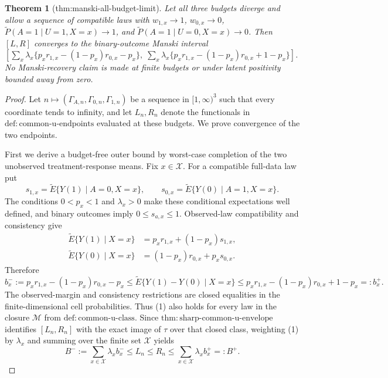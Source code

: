 \documentclass{article}
\newtheorem{theorem}{Theorem}
\begin{document}
\begin{theorem}[thm:manski-all-budget-limit]\label{thm:manski-all-budget-limit}
Let all three budgets diverge and allow a sequence of compatible laws with \(w_{1,x}\to1\), \(w_{0,x}\to0\), \(\widetilde P(A=1\mid U=1,X=x)\to1\), and \(\widetilde P(A=1\mid U=0,X=x)\to0\).  Then \([L,R]\) converges to the binary-outcome Manski interval \(\left[\sum_x\lambda_x\{p_xr_{1,x}-(1-p_x)r_{0,x}-p_x\},\;\sum_x\lambda_x\{p_xr_{1,x}-(1-p_x)r_{0,x}+1-p_x\}\right]\).  No Manski-recovery claim is made at finite budgets or under latent positivity bounded away from zero.
\end{theorem}
\begin{proof}
Let \(n\mapsto(\Gamma_{A,n},\Gamma_{0,n},\Gamma_{1,n})\) be a sequence in \([1,\infty)^3\) such that every coordinate tends to infinity, and let \(L_n,R_n\) denote the functionals in \(\mathrm{def{:}common\text{-}u\text{-}endpoints}\) evaluated at these budgets.  We prove convergence of the two endpoints.

First we derive a budget-free outer bound by worst-case completion of the two unobserved treatment-response means.  Fix \(x\in\mathcal X\).  For a compatible full-data law put
\[
 s_{1,x}=\widetilde E\{Y(1)\mid A=0,X=x\},
 \qquad
 s_{0,x}=\widetilde E\{Y(0)\mid A=1,X=x\}.
\]
The conditions \(0<p_x<1\) and \(\lambda_x>0\) make these conditional expectations well defined, and binary outcomes imply \(0\leq s_{a,x}\leq1\).  Observed-law compatibility and consistency give
\[
\begin{aligned}
 \widetilde E\{Y(1)\mid X=x\}
   &=p_xr_{1,x}+(1-p_x)s_{1,x},\\
 \widetilde E\{Y(0)\mid X=x\}
   &=(1-p_x)r_{0,x}+p_xs_{0,x}.
\end{aligned}
\]
Therefore
\[
 b_x^-:=p_xr_{1,x}-(1-p_x)r_{0,x}-p_x
 \leq \widetilde E\{Y(1)-Y(0)\mid X=x\}
 \leq p_xr_{1,x}-(1-p_x)r_{0,x}+1-p_x=:b_x^+.
 \tag{1}
\]
The observed-margin and consistency restrictions are closed equalities in the finite-dimensional cell probabilities.  Thus (1) also holds for every law in the closure \(\mathcal M\) from \(\mathrm{def{:}common\text{-}u\text{-}class}\).  Since \(\mathrm{thm{:}sharp\text{-}common\text{-}u\text{-}envelope}\) identifies \([L_n,R_n]\) with the exact image of \(\tau\) over that closed class, weighting (1) by \(\lambda_x\) and summing over the finite set \(\mathcal X\) yields
\[
 B^-:=\sum_{x\in\mathcal X}\lambda_xb_x^-
 \leq L_n\leq R_n\leq
 \sum_{x\in\mathcal X}\lambda_xb_x^+=:B^+.
 \tag{2}
\]


\end{proof}
\end{document}
